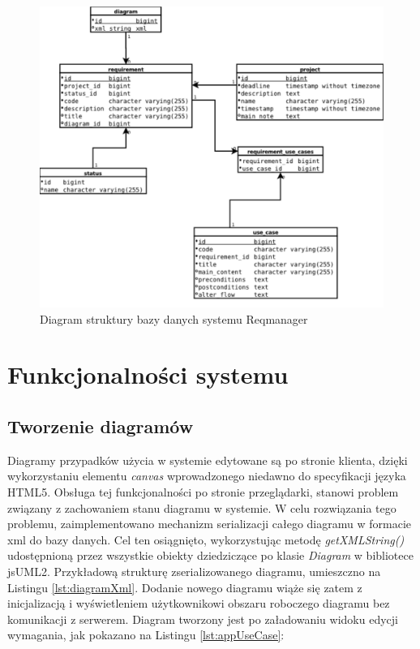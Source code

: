     \begin{figure}[p]
      \centering
      \includegraphics[width=1.0\textwidth]{img/erd2.pdf}
      \caption{Diagram struktury bazy danych systemu Reqmanager}
      \label{fig:erd1}
    \end{figure}

  \section{Funkcjonalności systemu}
  
    \subsection{Tworzenie diagramów}

      Diagramy przypadków użycia w systemie edytowane są po stronie klienta, dzięki wykorzystaniu elementu \emph{canvas} wprowadzonego niedawno do specyfikacji języka HTML5. Obsługa tej funkcjonalności po stronie przeglądarki, stanowi problem związany z zachowaniem stanu diagramu w systemie. W celu rozwiązania tego problemu, zaimplementowano mechanizm serializacji całego diagramu w formacie xml do bazy danych. Cel ten osiągnięto, wykorzystując metodę \emph{getXMLString()} udostępnioną przez wszystkie obiekty dziedziczące po klasie \emph{Diagram} w bibliotece jsUML2. Przykładową strukturę zserializowanego diagramu, umieszczno na Listingu \ref{lst:diagramXml}. 
      Dodanie nowego diagramu wiąże się zatem z inicjalizacją i wyświetleniem użytkownikowi obszaru roboczego diagramu bez komunikacji z serwerem. Diagram tworzony jest po załadowaniu widoku edycji wymagania, jak pokazano na Listingu \ref{lst:appUseCase}:


